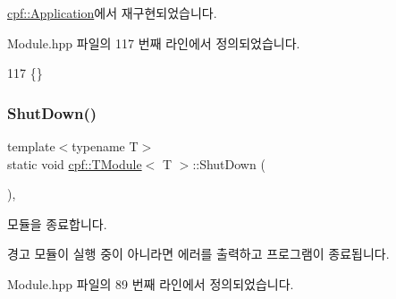 \hyperlink{classcpf_1_1_application_ae8e759c8722c48c45dc3e02446062aec}{cpf\+::\+Application}에서 재구현되었습니다.



Module.\+hpp 파일의 117 번째 라인에서 정의되었습니다.


\begin{DoxyCode}
117 \{\}
\end{DoxyCode}
\mbox{\label{classcpf_1_1_t_module_a61452801c61e2546b75a7a6a545e82ee}} 
\subsubsection{\texorpdfstring{Shut\+Down()}{ShutDown()}}
{\footnotesize\ttfamily template$<$typename T$>$ \\
static void \hyperlink{classcpf_1_1_t_module}{cpf\+::\+T\+Module}$<$ T $>$\+::Shut\+Down (\begin{DoxyParamCaption}{ }\end{DoxyParamCaption})\hspace{0.3cm}{\ttfamily [inline]}, {\ttfamily [static]}}

모듈을 종료합니다. \begin{DoxyWarning}{경고}
모듈이 실행 중이 아니라면 에러를 출력하고 프로그램이 종료됩니다. 
\end{DoxyWarning}


Module.\+hpp 파일의 89 번째 라인에서 정의되었습니다.


